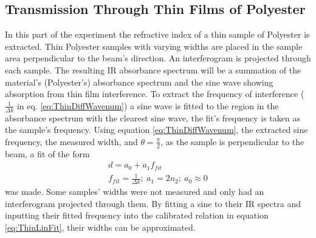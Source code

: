 \documentclass[reprint,amsmath,amssymb,aps, prl]{revtex4-2}
\begin{document}
\subsection{Transmission Through Thin Films of Polyester}
In this part of the experiment the refractive index of a thin sample of Polyester is extracted. Thin Polyester samples with varying widths are placed in the sample area perpendicular to the beam's direction. An interferogram is projected through each sample. The resulting IR absorbance spectrum will be a summation of the material's (Polyester's) absorbance spectrum and the sine wave showing absorption from thin film interference. To extract the frequency of interference ($\frac{1}{\Delta k}$ in eq. \ref{eq:ThinDiffWavenum}) a sine wave is fitted to the region in the absorbance spectrum with the clearest sine wave, the fit's frequency is taken as the sample's frequency. Using equation \ref{eq:ThinDiffWavenum}, the extracted sine frequency, the measured width, and $\theta=\frac{\pi}{2}$, as the sample is perpendicular to the beam, a fit of the form
\begin{equation}
    \begin{gathered}
        \label{eq:ThinLinFit}
        d=a_{0}+a_{1}f_{fit} \\
        f_{fit} = \frac{1}{\Delta k};\ a_1=2n_{2};\ a_0\approx 0
    \end{gathered}
\end{equation}
was made. Some samples' widths were not measured and only had an interferogram projected through them. By fitting a sine to their IR spectra and inputting their fitted frequency into the calibrated relation in equation \ref{eq:ThinLinFit}, their widths can be approximated.
\end{document}
